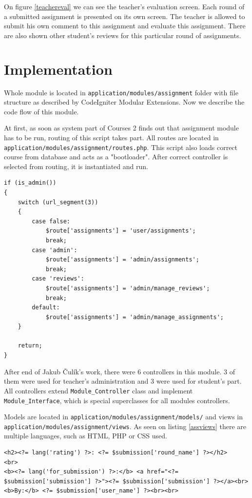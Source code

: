 On figure \ref{teachereval} we can see the teacher's evaluation screen. Each round of a submitted assignment is presented on its own screen. The teacher is allowed to submit his own comment to this assignment and evaluate this assignment. There are also shown other student's reviews for this particular round of assignments. 

\section{Implementation}

Whole module is located in \texttt{application/modules/assignment} folder with file structure as described by CodeIgniter Modular Extensions. Now we describe the code flow of this module.


At first, as soon as system part of Courses 2 finds out that assignment module has to be run, routing of this script takes part. All routes are located in \texttt{application/modules/assignment/routes.php}. This script also loads correct course from database and acts as a "bootloader". After correct controller is selected from routing, it is instantiated and run.

\begin{lstlisting}[label={assrouting}, caption={Routing in assignments module for administrator}]
if (is_admin())
{
    switch (url_segment(3))
    {
        case false:
            $route['assignments'] = 'user/assignments';
            break;
        case 'admin':
            $route['assignments'] = 'admin/assignments';
            break;
        case 'reviews':
            $route['assignments'] = 'admin/manage_reviews';
            break;
        default:
            $route['assignments'] = 'admin/manage_assignments';
    }

    return;
}
\end{lstlisting}


After end of Jakub \v{C}ul\'{i}k's \cite{culik} work, there were 6 controllers in this module. 3 of them were used for teacher's administration and 3 were used for student's part. All controllers extend \texttt{Module\_Controller} class and implement \texttt{Module\_Interface}, which is special superclasses for all modules controllers.

Models are located in \texttt{application/modules/assignment/models/} and views in \texttt{application/modules/assignment/views}. As seen on listing \ref{assviews} there are multiple languages, such as HTML, PHP or CSS used.

\begin{lstlisting}[label={assviews}, caption={Example of view in assignments module}]
<h2><?= lang('rating') ?>: <?= $submission['round_name'] ?></h2>
<br>
<b><?= lang('for_submission') ?>:</b> <a href="<?= $submission['submission'] ?>"><?= $submission['submission'] ?></a><br>
<b>By:</b> <?= $submission['user_name'] ?><br><br>
\end{lstlisting}
